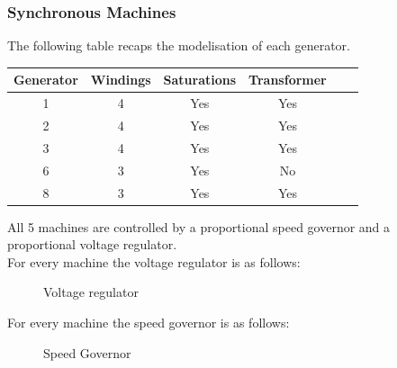 \documentclass[a4paper, 12pt]{report}
\begin{document}
\subsubsection{Synchronous Machines}

The following table recaps the modelisation of each generator.

\begin{center}
\begin{tabular}{|c|c|c|c|c|c|}
  \hline
  Generator & Windings  & Saturations & Transformer\\
  \hline
  1 & 4 & Yes & Yes\\
  2 & 4 & Yes & Yes\\
  3 & 4 & Yes & Yes\\
  6 & 3 & Yes & No\\
  8 & 3 & Yes & Yes\\
  \hline
\end{tabular}
\end{center}

All 5 machines are controlled by a proportional speed governor and a proportional voltage regulator. \\

For every machine the voltage regulator is as follows:
\begin{figure}[H]
\centering
{}
\caption{Voltage regulator}
\end{figure}

For every machine the speed governor is as follows:
\begin{figure}[H]
\centering
{}
\caption{Speed Governor}
\end{figure}
\end{document}

